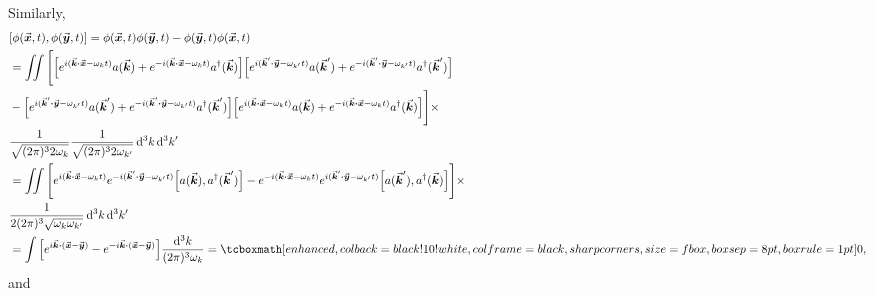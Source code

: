Similarly,
\begin{align}
    \label{eq:comm-phi-phi}
    &[\phi(\va*{x},t),\phi(\va*{y},t)] = \phi(\va*{x},t)\phi(\va*{y},t) - \phi(\va*{y},t)\phi(\va*{x},t) \\
                                     &= \iint \Bigg[ \Big[ e^{i(\va*{k}\vdot\va*{x} - \omega_{k}t)}a(\va*{k}) + e^{-i(\va*{k}\vdot \va*{x} - \omega_{k}t)}a^{\dagger}(\va*{k}) \Big] \Big[ e^{i(\va*{k}'\vdot\va*{y} - \omega_{k'}t)}a(\va*{k}') + e^{-i(\va*{k}'\vdot \va*{y} - \omega_{k'}t)}a^{\dagger}(\va*{k}') \Big] \notag \\
                                     &-  \Big[ e^{i(\va*{k}'\vdot\va*{y} - \omega_{k'}t)}a(\va*{k}') + e^{-i(\va*{k}'\vdot \va*{y} - \omega_{k'}t)}a^{\dagger}(\va*{k}') \Big] \Big[ e^{i(\va*{k}\vdot\va*{x} - \omega_{k}t)}a(\va*{k}) + e^{-i(\va*{k}\vdot \va*{x} - \omega_{k}t)}a^{\dagger}(\va*{k}) \Big] \Bigg] \times \notag \\
                                     &\frac{1}{\sqrt{(2\pi)^3 2\omega_{k}}} \frac{1}{\sqrt{(2\pi)^3 2\omega_{k'}}} \dd[3]{k} \dd[3]{k'} \\
                                     &= \iint \Bigg[ e^{i(\va*{k} \vdot \va*{x} - \omega_{k}t)}e^{-i(\va*{k}' \vdot \va*{y} - \omega_{k'}t)}\Big[a(\va*{k}),a^{\dagger}(\va*{k}')\Big] - e^{-i(\va*{k} \vdot \va*{x} - \omega_{k}t)}e^{i(\va*{k}' \vdot \va*{y} - \omega_{k'}t)} \Big[a(\va*{k}'),a^{\dagger}(\va*{k}) \Big] \Bigg] \times \notag \\
                                     &\frac{1}{2(2\pi)^3\sqrt{\omega_{k}\omega_{k'}}} \dd[3]{k}\dd[3]{k'} \\
                                     &= \int \Big[ e^{i \va*{k} \vdot (\va*{x} - \va*{y})} - e^{-i \va*{k} \vdot (\va*{x} - \va*{y})} \Big] \frac{\dd[3]{k}}{(2\pi)^3 \omega_{k}} = \eqbox{0}
,\end{align}
and
